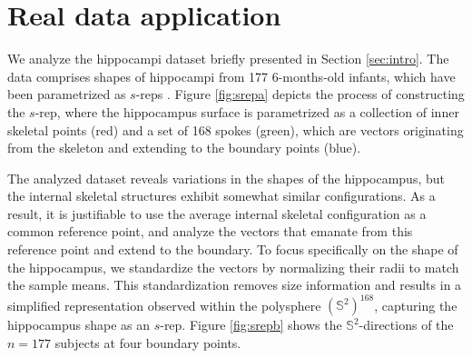 \documentclass[oneside,11pt]{article}
\begin{document}
\section{Real data application}
\label{sec:data}

We analyze the hippocampi dataset briefly presented in Section \ref{sec:intro}. The data comprises shapes of hippocampi from 177 $6$-months-old infants, which have been parametrized as $s$-reps \citep{liu2021fitting}.  %
Figure \ref{fig:srepa} depicts the process of constructing the $s$-rep, where the hippocampus surface is parametrized as a collection of inner skeletal points (red) and a set of 168 spokes (green), which are vectors originating from the skeleton and extending to the boundary points (blue).

The analyzed dataset reveals variations in the shapes of the hippocampus, but the internal skeletal structures exhibit somewhat similar configurations. As a result, it is justifiable to use the average internal skeletal configuration as a common reference point, and analyze the vectors that emanate from this reference point and extend to the boundary. To focus specifically on the shape of the hippocampus, we standardize the vectors by normalizing their radii to match the sample means. This standardization removes size information and results in a simplified representation observed within the polysphere $(\mathbb{S}^2)^{168}$, capturing the hippocampus shape as an $s$-rep. Figure \ref{fig:srepb} shows the $\mathbb{S}^2$-directions of the $n=177$ subjects at four boundary points.

%
\end{document}
